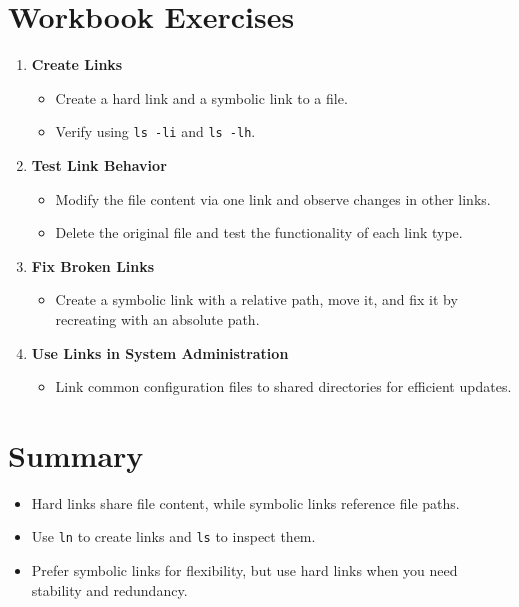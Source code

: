 \documentclass[a4paper]{report}
\begin{document}
\section*{Workbook Exercises}

\begin{enumerate}
    \item \textbf{Create Links}
    \begin{itemize}
        \item Create a hard link and a symbolic link to a file.
        \item Verify using \texttt{ls -li} and \texttt{ls -lh}.
    \end{itemize}

    \item \textbf{Test Link Behavior}
    \begin{itemize}
        \item Modify the file content via one link and observe changes in other links.
        \item Delete the original file and test the functionality of each link type.
    \end{itemize}

    \item \textbf{Fix Broken Links}
    \begin{itemize}
        \item Create a symbolic link with a relative path, move it, and fix it by recreating with an absolute path.
    \end{itemize}

    \item \textbf{Use Links in System Administration}
    \begin{itemize}
        \item Link common configuration files to shared directories for efficient updates.
    \end{itemize}
\end{enumerate}

\section*{Summary}
\begin{itemize}
    \item Hard links share file content, while symbolic links reference file paths.
    \item Use \texttt{ln} to create links and \texttt{ls} to inspect them.
    \item Prefer symbolic links for flexibility, but use hard links when you need stability and redundancy.
\end{itemize}
\end{document}
